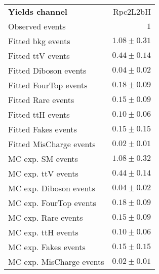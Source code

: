 

\begin{table}
\begin{center}
\setlength{\tabcolsep}{0.0pc}
{\small
\begin{tabular*}{\textwidth}{@{\extracolsep{\fill}}lr}
\noalign{\smallskip}\hline\noalign{\smallskip}
{\bfseries Yields channel}           & Rpc2L2bH              \\[-0.05cm]
\noalign{\smallskip}\hline\noalign{\smallskip}
Observed events          & $1$                    \\
\noalign{\smallskip}\hline\noalign{\smallskip}
Fitted bkg events         & $1.08 \pm 0.31$              \\
\noalign{\smallskip}\hline\noalign{\smallskip}
        Fitted ttV events         & $0.44 \pm 0.14$              \\
        Fitted Diboson events         & $0.04 \pm 0.02$              \\
        Fitted FourTop events         & $0.18 \pm 0.09$              \\
        Fitted Rare events         & $0.15 \pm 0.09$              \\
        Fitted ttH events         & $0.10 \pm 0.06$              \\
        Fitted Fakes events         & $0.15 \pm 0.15$              \\
        Fitted MisCharge events         & $0.02 \pm 0.01$              \\
 \noalign{\smallskip}\hline\noalign{\smallskip}
MC exp. SM events              & $1.08 \pm 0.32$              \\
\noalign{\smallskip}\hline\noalign{\smallskip}
        MC exp. ttV events         & $0.44 \pm 0.14$              \\
        MC exp. Diboson events         & $0.04 \pm 0.02$              \\
        MC exp. FourTop events         & $0.18 \pm 0.09$              \\
        MC exp. Rare events         & $0.15 \pm 0.09$              \\
        MC exp. ttH events         & $0.10 \pm 0.06$              \\
        MC exp. Fakes events         & $0.15 \pm 0.15$              \\
        MC exp. MisCharge events         & $0.02 \pm 0.01$              \\

\end{tabular*}}
\end{center}
\end{table}
